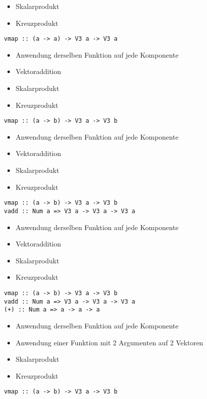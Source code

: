 \documentclass{beamer}
\begin{document}
\begin{frame}[fragile]
\begin{overprint}
\begin{itemize}
 \item Skalarprodukt
 \item Kreuzprodukt
\end{itemize}
\begin{verbatim}
vmap :: (a -> a) -> V3 a -> V3 a
\end{verbatim}
\begin{itemize}
 \item Anwendung derselben Funktion auf jede Komponente
 \item Vektoraddition
 \item Skalarprodukt
 \item Kreuzprodukt
\end{itemize}
\begin{verbatim}
vmap :: (a -> b) -> V3 a -> V3 b
\end{verbatim}
\begin{itemize}
 \item Anwendung derselben Funktion auf jede Komponente
 \item Vektoraddition
 \item Skalarprodukt
 \item Kreuzprodukt
\end{itemize}
\begin{verbatim}
vmap :: (a -> b) -> V3 a -> V3 b
vadd :: Num a => V3 a -> V3 a -> V3 a
\end{verbatim}
\begin{itemize}
 \item Anwendung derselben Funktion auf jede Komponente
 \item Vektoraddition
 \item Skalarprodukt
 \item Kreuzprodukt
\end{itemize}
\begin{verbatim}
vmap :: (a -> b) -> V3 a -> V3 b
vadd :: Num a => V3 a -> V3 a -> V3 a
(+) :: Num a => a -> a -> a
\end{verbatim}
\begin{itemize}
 \item Anwendung derselben Funktion auf jede Komponente
 \item Anwendung einer Funktion mit 2 Argumenten auf 2 Vektoren
 \item Skalarprodukt
 \item Kreuzprodukt
\end{itemize}
\begin{verbatim}
vmap :: (a -> b) -> V3 a -> V3 b

\end{verbatim}
\end{overprint}
\end{frame}
\end{document}

